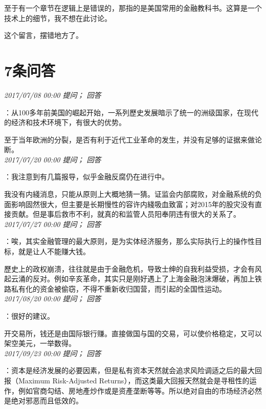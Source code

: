 \documentclass[twocolumn]{ctexart}
\begin{document}
至于有一个章节在逻辑上是错误的，那指的是美国常用的金融教科书。这算是一个技术上的细节，我不想在此讨论。

这个留言，摆错地方了。\\

\section{7条问答}

\textit{\hfill\noindent\small 2017/07/08 00:00 提问； 回答}

：从100多年前美国的崛起开始，一系列歷史发展暗示了统一的洲级国家，在现代的经济和技术环境下，有很大的优势。

至于当年欧洲的分裂，是否有利于近代工业革命的发生，并没有足够的证据来做论断。\\

\textit{\hfill\noindent\small 2017/07/20 00:00 提问； 回答}

：我注意到有几篇报导，似乎金融反腐仍在进行中。

我没有内綫消息，只能从原则上大概地猜一猜。证监会内部腐败，对金融系统的负面影响固然很大，但主要是长期慢性的容许内綫吸血致富；对2015年的股灾没有直接贡献。但是事后救市不利，就真的和监管人员阳奉阴违有很大的关系了。\\

\textit{\hfill\noindent\small 2017/07/27 00:00 提问； 回答}

：唉，其实金融管理的最大原则，是为实体经济服务，那么实际执行上的操作性目标，就是让人不能赚大钱。

歷史上的政权崩溃，往往就是由于金融危机，导致士绅的自我利益受损，才会有风起云涌的反对。例如辛亥革命，其实只是刚好遇上了上海金融泡沫爆破，再加上铁路私有化的资金被偷窃，不得不重新收归国营，而引起的全国性运动。\\

\textit{\hfill\noindent\small 2017/08/20 00:00 提问； 回答}

：很好的建议。

开交易所，钱还是由国际银行赚。直接做国与国的交易，可以使价格稳定，又可以架空美元，一举数得。\\

\textit{\hfill\noindent\small 2017/09/23 00:00 提问； 回答}

：资本是经济发展的必要因素，但是私有资本天然就会追求风险调适之后的最大回报（Maximum Risk-Adjusted Returns），而这类最大回报天然就会是寻租性的运作，例如官商勾结、房地產炒作或是资產垄断等等。所以绝对自由的市场经济必然是绝对邪恶而且低效的。\\
\end{document}

